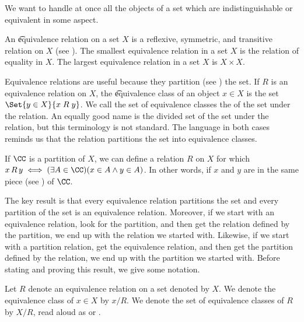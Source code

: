 

We want to handle at once all the objects of a set which are indistinguishable or equivalent in some aspect.


An \t{equivalence relation} on a set $X$ is a reflexive, symmetric, and transitive relation on $X$ (see ).
The smallest equivalence relation in a set $X$ is the relation of equality in $X$.
The largest equivalence relation in a set $X$ is $X \times X$.

Equivalence relations are useful because they partition (see ) the set.
If $R$ is an equivalence relation on $X$, the \t{equivalence class} of an object $x \in X$ is the set $\Set{y \in X}{x\;R\;y}$.
We call the set of equivalence classes the  of the set under the relation.
An equally good name is the divided set of the set under the relation, but this terminology is not standard.
The language in both cases reminds us that the relation partitions the set into equivalence classes.

If $\CC$ is a partition of $X$, we can define a relation $R$ on $X$ for which $x\,R\,y \iff (\exists A \in \CC)(x \in A \land y \in A)$.
In other words, if $x$ and $y$ are in the same piece (see ) of $\CC$.

The key result is that every equivalence relation partitions the set and every partition of the set is an equivalence relation.
Moreover, if we start with an equivalence relation, look for the partition, and then get the relation defined by the partition, we end up with the relation we started with.
Likewise, if we start with a partition relation, get the equivalence relation, and then get the partition defined by the relation, we end up with the partition we started with.
Before stating and proving this result, we give some notation.


Let $R$ denote an equivalence relation on a set denoted by $X$.
We denote the equivalence class of $x \in X$ by $x / R$.
We denote the set of equivalence classes of $R$ by $X/R$, read aloud as  or .


